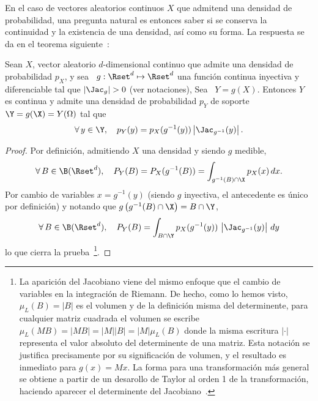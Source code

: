 En el  caso de vectores  aleatorios continuos $X$  que admitend una  densidad de
probabilidad,  una  pregunta  natural  es  entonces  saber  si  se  conserva  la
continuidad y la  existencia de una densidad, as\'i como  su forma. La respuesta
se da en el teorema siguiente~\cite{Bre88, JacPro03, AthLah06, Coh13, HogMck13}:
%
\begin{teorema}\label{Teo:MP:TransformacionInyectivaDensidad}
%
  Sean $X$, vector aleatorio  $d$-dimensional continuo que  admite una densidad
  de probabilidad  $p_X$, y sea \ $g:\Rset^d  \mapsto \Rset^d$ una  funci\'on continua
  inyectiva y diferenciable tal que
  $\left| \Jac_g \right| > 0$ (ver notaciones),
  Sea  \  $Y =  g(X)$.   Entonces  $Y$ es  continua  y  admite  una densidad  de
  probabilidad $p_Y$ de soporte $\Y = g(\X) = Y(\Omega)$ tal que
  \[
  \forall \,  y \in  \Y, \quad p_Y(y)  = p_X(g^{-1}(y))  \left| \Jac_{g^{-1}}(y)
  \right|.
  \]
\end{teorema}
%
\begin{proof}
  Por definici\'on, admitiendo $X$ una densidad y  siendo $g$ medible,
  \[
  \forall \, B \in \B(\Rset^d),  \quad P_Y(B) = P_X(g^{-1}(B)) = \int_{g^{-1}(B)
    \cap \X} p_X(x) \, dx.
  \]
  Por cambio de variables $x  = g^{-1}(y)$ (siendo $g$ inyectiva, el antecedente
  es \'unico por definici\'on) y  notando que $g\left( g^{-1}(B) \cap \X \right)
  = B \cap \Y$,
  \[
  \forall \, B  \in \B(\Rset^d), \quad P_Y(B) =  \int_{B \cap \Y} p_X(g^{-1}(y))
  \, \left| \Jac_{g^{-1}}(y) \right| \, dy
  \]
  lo que cierra la prueba~\footnote{La aparici\'on del Jacobiano viene del mismo
    enfoque que el cambio de variables en la integraci\'on de Riemann. De hecho,
    como lo  hemos visto, $\mu_L(B)  = |B|$ es  el volumen y de  la definici\'on
    misma del determinente, para cualquier matriz cuadrada el volumen se escribe
    \ $\mu_L(M  B) = |M B|  = |M| |B| =  |M| \mu_L(B)$ donde  la misma escritura
    $|\cdot|$ representa el valor absoluto  del determinente de una matriz. Esta
    notaci\'on se justifica precisamente por su significaci\'on de volumen, y el
    resultado   es  inmediato  para   $g(x)  =   M  x$.    La  forma   para  una
    transformaci\'on m\'as general se obtiene a partir de un desarollo de Taylor
    al orden  1 de  la transformaci\'on, haciendo  aparecer el  determinente del
    Jacobiano~\cite{AthLah06, Coh13}.}.
\end{proof}

